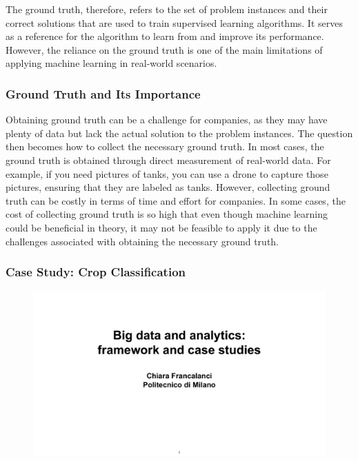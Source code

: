 The ground truth, therefore, refers to the set of problem instances and
their correct solutions that are used to train supervised learning
algorithms. It serves as a reference for the algorithm to learn from and
improve its performance. However, the reliance on the ground truth is
one of the main limitations of applying machine learning in real-world
scenarios.


\subsubsection{Ground Truth and Its
  Importance}\label{ground-truth-and-its-importance}

Obtaining ground truth can be a challenge for companies, as they may
have plenty of data but lack the actual solution to the problem
instances. The question then becomes how to collect the necessary ground
truth. In most cases, the ground truth is obtained through direct
measurement of real-world data. For example, if you need pictures of
tanks, you can use a drone to capture those pictures, ensuring that they
are labeled as tanks. However, collecting ground truth can be costly in
terms of time and effort for companies. In some cases, the cost of
collecting ground truth is so high that even though machine learning
could be beneficial in theory, it may not be feasible to apply it due to
the challenges associated with obtaining the necessary ground truth.


\subsubsection{Case Study: Crop
  Classification}\label{case-study-crop-classification}

\begin{figure}[!h]
  \centering
  \includegraphics[page=7, trim = 1.5cm 1cm 1.5cm 4.8cm, clip, width=\imagewidth]{images/06 - BIG_DATA.pdf}
\end{figure}

